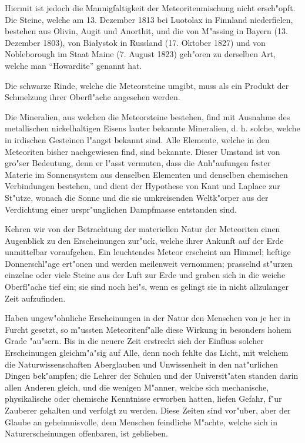 \documentclass[a4paper, 11pt, oneside]{article}
\begin{document}
Hiermit ist jedoch die Mannigfaltigkeit der Meteoritenmischung nicht ersch"opft. Die Steine, welche am 13. Dezember 1813 bei Luotolax in Finnland niederfielen, bestehen aus Olivin, Augit und Anorthit, und die von M"assing in Bayern (13. Dezember 1803), von Białystok in Russland (17. Oktober 1827) und von Nobleborough im Staat Maine (7. August 1823) geh"oren zu derselben Art, welche man "`Howardite"' genannt hat.

Die schwarze Rinde, welche die Meteorsteine umgibt, muss als ein Produkt der Schmelzung ihrer Oberfl"ache angesehen werden.

Die Mineralien, aus welchen die Meteorsteine bestehen, find mit Ausnahme des metallischen nickelhaltigen Eisens lauter bekannte Mineralien, d. h. solche, welche in irdischen Gesteinen l"angst bekannt sind. Alle Elemente, welche in den Meteoriten bisher nachgewiesen find, sind bekannte. Dieser Umstand ist von gro"ser Bedeutung, denn er l"asst vermuten, dass die Anh"aufungen fester Materie im Sonnensystem aus denselben Elementen und denselben chemischen Verbindungen bestehen, und dient der Hypothese von Kant und Laplace zur St"utze, wonach die Sonne und die sie umkreisenden Weltk"orper aus der Verdichtung einer urspr"unglichen Dampfmasse entstanden sind.

Kehren wir von der Betrachtung der materiellen Natur der Meteoriten einen Augenblick zu den Erscheinungen zur"uck, welche ihrer Ankunft auf der Erde unmittelbar voraufgehen. Ein leuchtendes Meteor erscheint am Himmel; heftige Donnerschl"age ert"onen und werden meilenweit vernommen; prasselnd st"urzen einzelne oder viele Steine aus der Luft zur Erde und graben sich in die weiche Oberfl"ache tief ein; sie sind noch hei"s, wenn es gelingt sie in nicht allzulanger Zeit aufzufinden.

Haben ungew"ohnliche Erscheinungen in der Natur den Menschen von je her in Furcht gesetzt, so m"ussten Meteoritenf"alle diese Wirkung in besonders hohem Grade "au"sern. Bis in die neuere Zeit erstreckt sich der Einfluss solcher Erscheinungen gleichm"a"sig auf Alle, denn noch fehlte das Licht, mit welchem die Naturwissenschaften Aberglauben und Unwissenheit in den nat"urlichen Dingen bek"ampfen; die Lehrer der Schulen und der Universit"aten standen darin allen Anderen gleich, und die wenigen M"anner, welche sich mechanische, physikalische oder chemische Kenntnisse erworben hatten, liefen Gefahr, f"ur Zauberer gehalten und verfolgt zu werden. Diese Zeiten sind vor"uber, aber der Glaube an geheimnisvolle, dem Menschen feindliche M"achte, welche sich in Naturerscheinungen offenbaren, ist geblieben.
\end{document}
